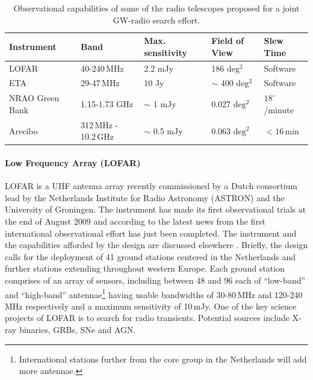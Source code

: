 \documentclass[epsf]{article}
\begin{document}
\begin{table}[h!]
\begin{center}
\begin{tabular}{|l|l|l|l|l|}\hline
Instrument & Band & Max. sensitivity & Field of View & Slew Time\\ \hline \hline
LOFAR & 40-240\,MHz & 2.2 mJy & 186 $\mathrm{deg^2}$ & Software \\ \hline
ETA & 29-47\,MHz & 10 Jy &  $\sim$ 400 $\mathrm{deg^2}$& Software \\ \hline
NRAO Green Bank & 1.15-1.73 GHz & $\sim$ 1 mJy &
0.027 $\mathrm{deg^2}$ &  $18^\circ$/minute\\ \hline
Arecibo & 312\,MHz - 10.2\,GHz & $\sim$ 0.5 mJy &
0.063 $\mathrm{deg^2}$ & $<16$\,min\\

\hline
\end{tabular}
\end{center}
\label{tab:radioinst}
\caption{Observational capabilities of some of the radio telescopes proposed for a joint GW-radio search effort.} \footnotemark
\end{table}

\paragraph{Low Frequency Array (LOFAR)} 
LOFAR is a UHF antenna array recently commissioned by a Dutch consortium
lead by the Netherlands Institute for Radio Astronomy (ASTRON) and the
University of Groningen. The instrument has made its first observational
trials at the end of August 2009 and according to the latest news from
\cite{Garrett:2009gp} the first international observational effort has
just been completed. The instrument and the capabilities afforded by the
design are discussed elsewhere \cite{lofar_case}. Briefly, the design
calls for the deployment of 41 ground stations centered in the
Netherlands and further stations extending throughout western Europe.
Each ground station comprises of an array of sensors, including between
48 and 96 each of ``low-band'' and ``high-band'' antennae\footnote{International stations further from the core group in
the Netherlands will add more antennae.} having usable bandwidths of
30-80\,MHz and 120-240\,MHz respectively and a maximum sensitivity of
10\,mJy.  One of the key science projects of LOFAR is to search for
radio transients.  Potential sources include X-ray binaries, GRBs, SNe
and AGN. 
\end{document}
